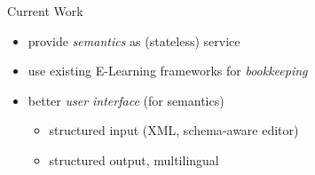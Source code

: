 \begin{slide}{Current Work}

  \begin{itemize}
  \item provide \emph{semantics} as (stateless) service
  \item use existing E-Learning frameworks for \emph{bookkeeping}
  \item better \emph{user interface} (for semantics) 
    \begin{itemize}
    \item structured input (XML, schema-aware editor)
    \item structured output, multilingual
    \end{itemize}
  \end{itemize}

\end{slide}

